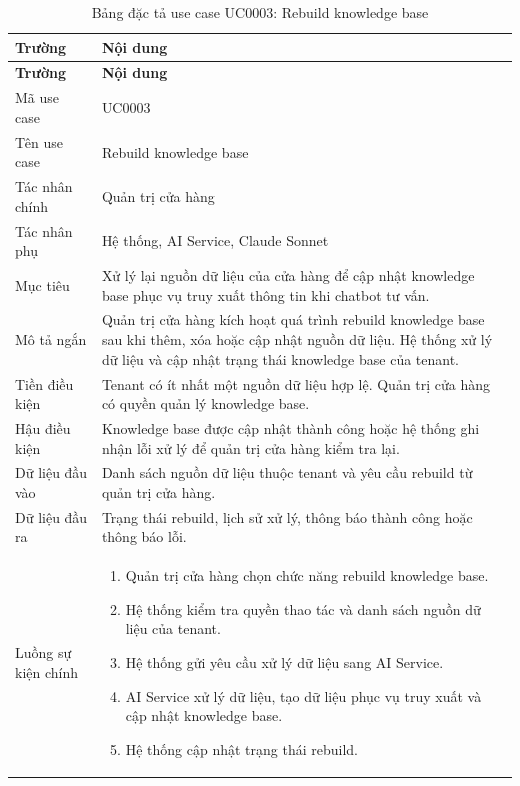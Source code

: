 \documentclass[../DoAn.tex]{subfiles}
\begin{document}
\begin{longtable}{|p{}|p{}|}
\caption{Bảng đặc tả use case UC0003: Rebuild knowledge base}
\label{table:UC0003} \\
\hline
\textbf{Trường} & \textbf{Nội dung} \\
\hline
\endfirsthead

\hline
\textbf{Trường} & \textbf{Nội dung} \\
\hline
\endhead

Mã use case & UC0003 \\
\hline
Tên use case & Rebuild knowledge base \\
\hline
Tác nhân chính & Quản trị cửa hàng \\
\hline
Tác nhân phụ & Hệ thống, AI Service, Claude Sonnet \\
\hline
Mục tiêu & Xử lý lại nguồn dữ liệu của cửa hàng để cập nhật knowledge base phục vụ truy xuất thông tin khi chatbot tư vấn. \\
\hline
Mô tả ngắn & Quản trị cửa hàng kích hoạt quá trình rebuild knowledge base sau khi thêm, xóa hoặc cập nhật nguồn dữ liệu. Hệ thống xử lý dữ liệu và cập nhật trạng thái knowledge base của tenant. \\
\hline
Tiền điều kiện & Tenant có ít nhất một nguồn dữ liệu hợp lệ. Quản trị cửa hàng có quyền quản lý knowledge base. \\
\hline
Hậu điều kiện & Knowledge base được cập nhật thành công hoặc hệ thống ghi nhận lỗi xử lý để quản trị cửa hàng kiểm tra lại. \\
\hline
Dữ liệu đầu vào & Danh sách nguồn dữ liệu thuộc tenant và yêu cầu rebuild từ quản trị cửa hàng. \\
\hline
Dữ liệu đầu ra & Trạng thái rebuild, lịch sử xử lý, thông báo thành công hoặc thông báo lỗi. \\
\hline
Luồng sự kiện chính &
\begin{minipage}[t]{0.68\textwidth}
\begin{enumerate}
    \item Quản trị cửa hàng chọn chức năng rebuild knowledge base.
    \item Hệ thống kiểm tra quyền thao tác và danh sách nguồn dữ liệu của tenant.
    \item Hệ thống gửi yêu cầu xử lý dữ liệu sang AI Service.
    \item AI Service xử lý dữ liệu, tạo dữ liệu phục vụ truy xuất và cập nhật knowledge base.
    \item Hệ thống cập nhật trạng thái rebuild.

\end{enumerate}
\end{minipage}
\end{longtable}
\end{document}
